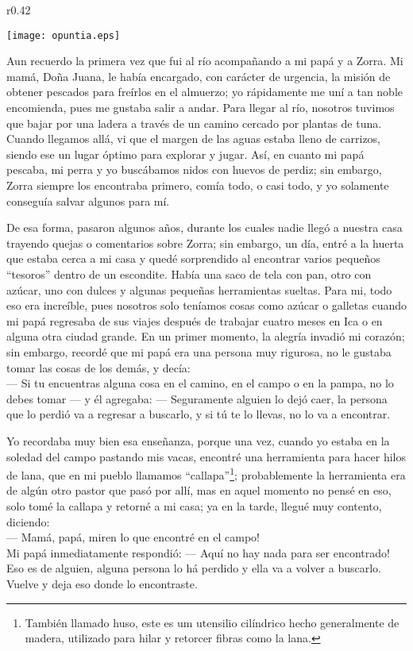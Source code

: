 \ifdefined\EnableIncludeImages
\begin{wrapfigure}{r}{0.42\textwidth}
  \begin{center}
  \vspace{-30pt}
    \texttt{[image: opuntia.eps]}
  \end{center}
  \vspace{-20pt}
\end{wrapfigure}
\fi
Aun recuerdo la primera vez que fui al río acompañando a mi papá y a Zorra. Mi mamá, Doña Juana, le había encargado, con carácter de urgencia, la misión de obtener pescados para freírlos en el almuerzo; yo rápidamente me uní a tan noble encomienda, pues me gustaba salir a andar.
Para llegar al río, nosotros tuvimos que bajar por una ladera a través de un camino cercado por plantas de tuna. Cuando llegamos allá, vi que el margen de las aguas estaba lleno de carrizos, siendo ese un lugar óptimo para explorar y jugar. Así, en cuanto mi papá pescaba, mi perra y yo buscábamos nidos con huevos de perdiz; sin embargo, Zorra siempre los encontraba primero, comía todo, o casi todo, y yo solamente conseguía salvar algunos para mí. 

De esa forma, pasaron algunos años, durante los cuales nadie llegó a nuestra casa trayendo quejas o comentarios sobre Zorra; sin embargo, un día, entré a la huerta que estaba cerca a mi casa y quedé sorprendido al encontrar varios pequeños ``tesoros'' dentro de un escondite. Había una saco de tela con pan, otro con azúcar, uno con dulces y algunas pequeñas herramientas sueltas.
Para mi, todo eso era increíble, pues nosotros solo teníamos cosas como azúcar o galletas cuando mi papá regresaba de sus viajes después de trabajar cuatro meses en Ica o en alguna otra ciudad grande. 
En un primer momento, la alegría invadió mi corazón; sin embargo, recordé que mi papá era una persona muy rigurosa, no le gustaba tomar las cosas de los demás, y decía: \\\indent
--- Si tu encuentras alguna cosa en el camino, en el campo o en la pampa, no lo debes tomar ---
y él agregaba:
--- Seguramente alguien lo dejó caer, la persona que lo perdió va a regresar a buscarlo, y si tú te lo llevas, no lo va a encontrar.

Yo recordaba muy bien esa enseñanza, porque una vez, cuando yo estaba en la soledad del campo pastando mis vacas, encontré una herramienta para hacer hilos de lana, que en mi pueblo llamamos ``callapa''\footnote{También llamado huso, este es um utensilio cilíndrico hecho generalmente de madera, utilizado para hilar y retorcer fibras como la lana.}; probablemente la herramienta era de algún otro pastor que pasó por allí, mas en aquel momento no pensé en eso, solo tomé la callapa y retorné a mi casa; ya en la tarde, llegué muy contento, diciendo:\\\indent
--- Mamá, papá, miren lo que encontré en el campo!\\\indent
Mi papá inmediatamente respondió:  
--- Aquí no hay nada para ser encontrado! Eso es de alguien, alguna persona lo há perdido y ella va a volver a buscarlo. Vuelve y deja eso donde lo encontraste.

